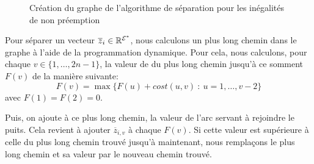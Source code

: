 \begin{ex}
\begin{figure}[!htb]
  \caption{Création du graphe de l'algorithme de séparation pour les
      inégalités de non préemption}
    \label{fig:sep_algo}
  \end{figure}
\end{ex}

Pour séparer un vecteur $\overline{z}_i \in \mathbb{R}^{{\cal E}^*}$, nous
calculons un plus long chemin dans le graphe à l'aide de la
programmation dynamique. Pour cela, nous calculons, pour chaque $v \in
\{1,\dots,2n-1\}$, la valeur de du plus long chemin jusqu'à ce somment
$F(v)$ de la manière suivante:
\begin{equation}
  F(v) = \max\{ F(u) + cost (u,v) \ : \ u=1,\dots,v-2 \}
\end{equation}
avec $F(1)=F(2)=0$. 

Puis, on ajoute à ce plus long chemin, la valeur de l'arc servant à
rejoindre le puits. Cela revient à ajouter $\overline{z}_{i,v}$ à
chaque $F(v)$. Si cette valeur est supérieure à celle du
plus long chemin trouvé jusqu'à maintenant, nous remplaçons le plus
long chemin et sa valeur par le nouveau chemin trouvé.

